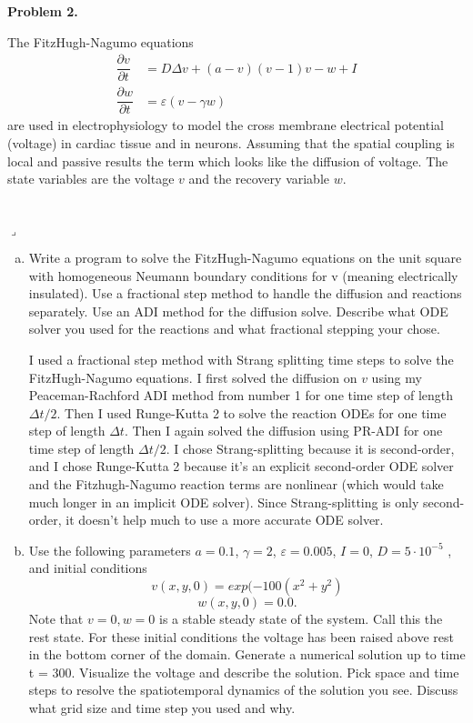 \documentclass[12pt]{article}
\newenvironment{myprob}[1]
    {%
    \noindent{\Huge$\ulcorner$}\textbf{#1.}\begin{em}
    }
    { 
    \end{em} \\ \hphantom{l} \hfill {\Huge$\lrcorner$} }
\begin{document}
\begin{myprob}{Problem 2}
The FitzHugh-Nagumo equations
\begin{align*}
\dfrac{\partial v}{\partial t} &= D \Delta v + (a-v)(v-1)v -w + I \\
\dfrac{\partial w}{\partial t} &= \varepsilon(v-\gamma w)
\end{align*}
are used in electrophysiology to model the cross membrane electrical potential (voltage) in cardiac tissue and in neurons. Assuming that the spatial coupling is local and passive results the term which looks like the diffusion of voltage. The state variables are the voltage $v$ and the recovery variable $w$.
\end{myprob}
\begin{enumerate}[(a)]
\item Write a program to solve the FitzHugh-Nagumo equations on the unit square with homogeneous Neumann boundary conditions for v (meaning electrically insulated). Use a fractional step method to handle the diffusion and reactions separately. Use an ADI method for the diffusion solve. Describe what ODE solver you used for the reactions and what fractional stepping your chose.

I used a fractional step method with Strang splitting time steps to solve the FitzHugh-Nagumo equations.  I first solved the diffusion on $v$ using my Peaceman-Rachford ADI method from number 1 for one time step of length $\Delta t/2$.  Then I used Runge-Kutta 2 to solve the reaction ODEs for one time step of length $\Delta t$.  Then I again solved the diffusion using PR-ADI for one time step of length $\Delta t/2$.  I chose Strang-splitting because it is second-order, and I chose Runge-Kutta 2 because it's an explicit second-order ODE solver and the Fitzhugh-Nagumo reaction terms are nonlinear (which would take much longer in an implicit ODE solver).  Since Strang-splitting is only second-order, it doesn't help much to use a more accurate ODE solver.

\item Use the following parameters $a = 0.1$, $\gamma = 2$, $\varepsilon = 0.005$, $I = 0$, $D = 5 \cdot 10^{-5}$ , and initial conditions 
$$v(x, y, 0) = exp(-100(x^2 + y^2)$$
$$w(x, y, 0) = 0.0.$$
Note that $v = 0, w = 0$ is a stable steady state of the system. Call this the rest state. For these initial conditions the voltage has been raised above rest in the bottom corner of the domain. Generate a numerical solution up to time t = 300. Visualize the voltage and describe the solution. Pick space and time steps to resolve the spatiotemporal dynamics of the solution you see. Discuss what grid size and time step you used and why.


\end{enumerate}
\end{document}
